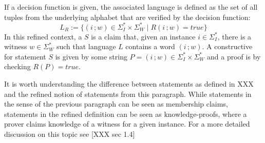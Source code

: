 If a decision function is given, the associated language is defined as the set of all tuples from the underlying alphabet that are verified by the decision function:
\begin{equation}
L_R := \{(i\,;w)\in \Sigma_I^* \times \Sigma_W^* \;|\; R(i\,;w)=true\}
\end{equation}
In this refined context, a  $S$ is a claim that, given an instance $i\in\Sigma_I^*$, there is a witness $w\in \Sigma_W^*$ such that language $L$ contains a word $(i\,;w)$. A constructive  for statement $S$ is given by some string $P=(i\,; w) \in \Sigma_I^* \times \Sigma_W^*$ and a proof is  by checking $R(P)=true$. 

It is worth understanding the difference between statements as defined in XXX and the refined notion of statements from this paragraph. While statements in the sense of the previous paragraph can be seen as membership claims, statements in the refined definition can be seen as knowledge-proofs, where a prover claims knowledge of a witness for a given instance. For a more detailed discussion on this topic see [XXX sec 1.4]
